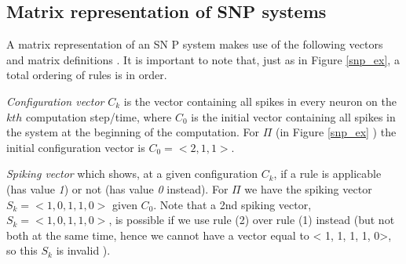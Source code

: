 \documentclass{acm_proc_article-sp}
\begin{document}







\subsection{Matrix representation of SNP systems}
A matrix representation of an SN P system makes use of the
following vectors and matrix definitions \cite{snpbrain}\cite{snpmat} . It is important to note that, just as in Figure \ref{snp_ex}, a total ordering of rules is in
order.

\textit{Configuration vector} $C_k$ is the vector containing all spikes in every neuron on the $kth$ computation step/time, where $C_0$ is the initial vector containing all spikes in the system at the beginning of the computation. For $\Pi$ (in Figure \ref{snp_ex} ) the initial configuration vector is $C_0 = < 2, 1, 1 >$.

\textit{Spiking vector} which shows, at a given configuration $C_k$, if a
rule is applicable (has value \textit{1}) or not (has value \textit{0} instead). For $\Pi$ we have the
spiking vector $S_k = < 1, 0, 1, 1, 0 >$ given $C_0$.
Note that a 2nd spiking vector, $S_k = < 1, 0, 1, 1, 0 >$, is
possible if we use rule (2) over rule (1) instead (but not both
at the same time, hence we cannot have a vector equal to
< 1, 1, 1, 1, 0>, so this $S_k$ is invalid ).
\end{document}
